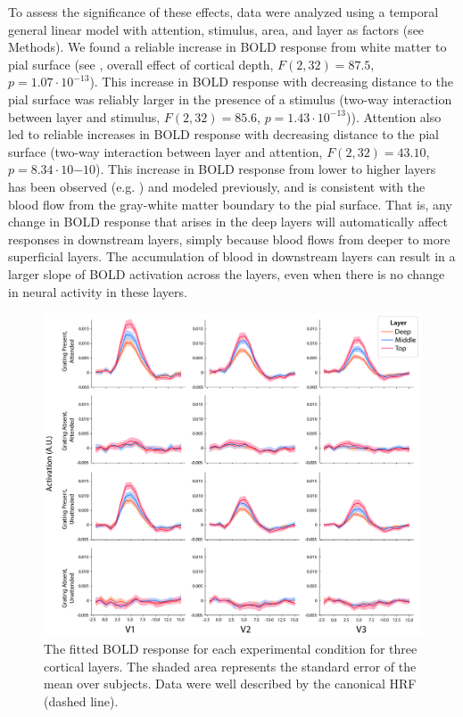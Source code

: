 \documentclass[9pt,lineno]{aperture}
\begin{document}
To assess the significance of these effects, data were analyzed using a temporal general linear model with attention, stimulus, area, and layer as factors (see Methods). We found a reliable increase in BOLD response from white matter to pial surface (see , overall effect of cortical depth, $F(2, 32)=87.5$, $p=1.07 \cdot 10^{-13}$). This increase in BOLD response with decreasing distance to the pial surface was reliably larger in the presence of a stimulus (two-way interaction between layer and stimulus, $F(2, 32)=85.6$, $p=1.43 \cdot 10^{-13}$)). Attention also led to reliable increases in BOLD response with decreasing distance to the pial surface (two-way interaction between layer and attention, $F(2,32)=43.10$, $p=8.34 \cdot 10{-10}$). 
This increase in BOLD response from lower to higher layers has been observed (e.g. \citet{Koopmans2010,Polimeni2010,Koopmans2011,Olman2012,Huber2018}) and modeled \cite{Markuerkiaga2016,Havlicek2020} previously, and is consistent with the blood flow from the gray-white matter boundary to the pial surface. That is, any change in BOLD response that arises in the deep layers will automatically affect responses in downstream layers, simply because blood flows from deeper to more superficial layers. The accumulation of blood in downstream layers can result in a larger slope of BOLD activation across the layers, even when there is no change in neural activity in these layers.
\begin{figure}
\includegraphics[width=\linewidth]{img/fir_layers.png}
\caption{The fitted BOLD response for each experimental condition for three cortical layers. The shaded area represents the standard error of the mean over subjects. Data were well described by the canonical HRF (dashed line).}
\label{fig:fir_layers}
\end{figure}
\end{document}
